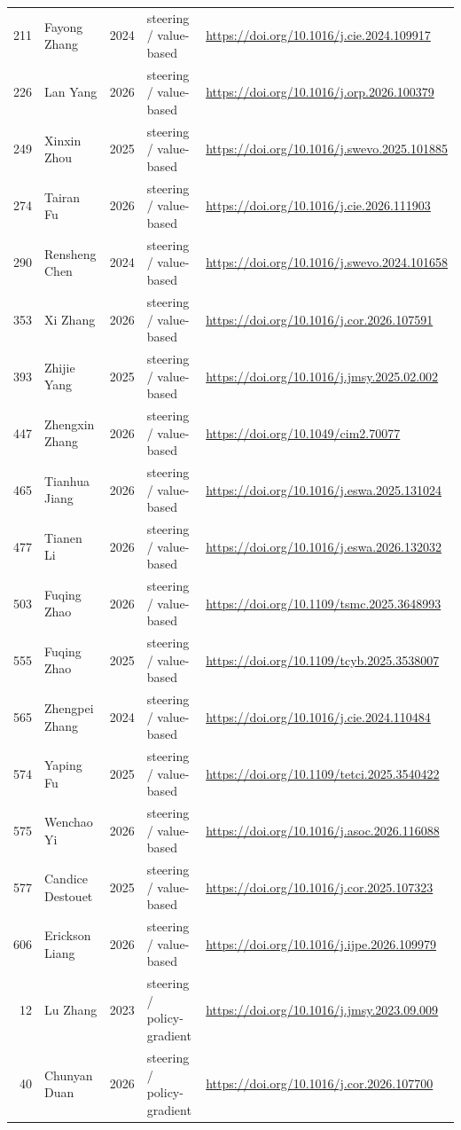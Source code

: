 \begin{longtable}{r p{3.0cm} r p{4.2cm} p{4.6cm}}
211 & Fayong Zhang & 2024 & steering / value-based & \url{https://doi.org/10.1016/j.cie.2024.109917} \\
226 & Lan Yang & 2026 & steering / value-based & \url{https://doi.org/10.1016/j.orp.2026.100379} \\
249 & Xinxin Zhou & 2025 & steering / value-based & \url{https://doi.org/10.1016/j.swevo.2025.101885} \\
274 & Tairan Fu & 2026 & steering / value-based & \url{https://doi.org/10.1016/j.cie.2026.111903} \\
290 & Rensheng Chen & 2024 & steering / value-based & \url{https://doi.org/10.1016/j.swevo.2024.101658} \\
353 & Xi Zhang & 2026 & steering / value-based & \url{https://doi.org/10.1016/j.cor.2026.107591} \\
393 & Zhijie Yang & 2025 & steering / value-based & \url{https://doi.org/10.1016/j.jmsy.2025.02.002} \\
447 & Zhengxin Zhang & 2026 & steering / value-based & \url{https://doi.org/10.1049/cim2.70077} \\
465 & Tianhua Jiang & 2026 & steering / value-based & \url{https://doi.org/10.1016/j.eswa.2025.131024} \\
477 & Tianen Li & 2026 & steering / value-based & \url{https://doi.org/10.1016/j.eswa.2026.132032} \\
503 & Fuqing Zhao & 2026 & steering / value-based & \url{https://doi.org/10.1109/tsmc.2025.3648993} \\
555 & Fuqing Zhao & 2025 & steering / value-based & \url{https://doi.org/10.1109/tcyb.2025.3538007} \\
565 & Zhengpei Zhang & 2024 & steering / value-based & \url{https://doi.org/10.1016/j.cie.2024.110484} \\
574 & Yaping Fu & 2025 & steering / value-based & \url{https://doi.org/10.1109/tetci.2025.3540422} \\
575 & Wenchao Yi & 2026 & steering / value-based & \url{https://doi.org/10.1016/j.asoc.2026.116088} \\
577 & Candice Destouet & 2025 & steering / value-based & \url{https://doi.org/10.1016/j.cor.2025.107323} \\
606 & Erickson Liang & 2026 & steering / value-based & \url{https://doi.org/10.1016/j.ijpe.2026.109979} \\
12 & Lu Zhang & 2023 & steering / policy-gradient & \url{https://doi.org/10.1016/j.jmsy.2023.09.009} \\
40 & Chunyan Duan & 2026 & steering / policy-gradient & \url{https://doi.org/10.1016/j.cor.2026.107700} \\

\end{longtable}
